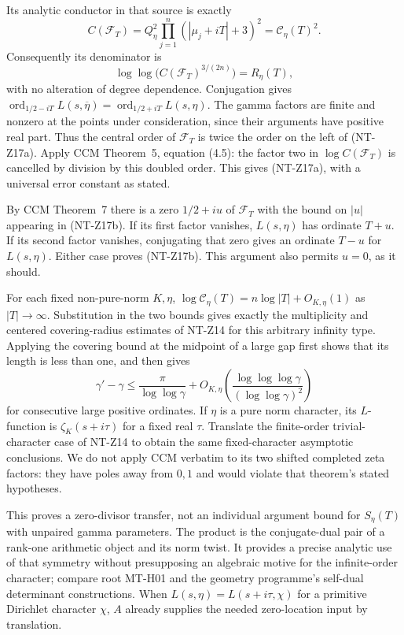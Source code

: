 Its analytic conductor in that source is exactly
\[
 C(\mathcal F_T)=Q_\eta^2
       \prod_{j=1}^n(|\mu_j+iT|+3)^2
       =\mathscr C_\eta(T)^2.
\]
Consequently its denominator is
\[
 \log\log\bigl(C(\mathcal F_T)^{3/(2n)}\bigr)
                  =R_\eta(T),
\]
with no alteration of degree dependence.
Conjugation gives
$\operatorname{ord}_{1/2-iT}L(s,\overline\eta)
=\operatorname{ord}_{1/2+iT}L(s,\eta)$.
The gamma factors are finite and nonzero at the points under
consideration, since their arguments have positive real part.
Thus the central order of $\mathcal F_T$ is twice the order on
the left of (NT-Z17a).  Apply CCM Theorem~5, equation (4.5): the
factor two in $\log C(\mathcal F_T)$ is cancelled by division
by this doubled order.  This gives (NT-Z17a), with a universal
error constant as stated.

By CCM Theorem~7 there is a zero $1/2+iu$ of $\mathcal F_T$
with the bound on $|u|$ appearing in (NT-Z17b).  If its first
factor vanishes, $L(s,\eta)$ has ordinate $T+u$.
If its second factor vanishes, conjugating that zero gives an
ordinate $T-u$ for $L(s,\eta)$.  Either case proves (NT-Z17b).
This argument also permits $u=0$, as it should.

For each fixed non-pure-norm $K,\eta$,
$\log\mathscr C_\eta(T)=n\log|T|+O_{K,\eta}(1)$ as
$|T|\to\infty$.  Substitution in the two bounds gives exactly
the multiplicity and centered covering-radius estimates of
NT-Z14 for this arbitrary infinity type.  Applying the covering
bound at the midpoint of a large gap first shows that its length
is less than one, and then gives
\[
 \gamma'-\gamma\le\frac{\pi}{\log\log\gamma}
    +O_{K,\eta}\left(
        \frac{\log\log\log\gamma}{(\log\log\gamma)^2}\right)
\]
for consecutive large positive ordinates.  If $\eta$ is a pure
norm character, its $L$-function is $\zeta_K(s+i\tau)$ for a
fixed real $\tau$.  Translate the finite-order trivial-character
case of NT-Z14 to obtain the same fixed-character asymptotic
conclusions.  We do not apply CCM verbatim to its two shifted
completed zeta factors: they have poles away from $0,1$ and would
violate that theorem's stated hypotheses.

This proves a zero-divisor transfer, not an individual argument
bound for $S_\eta(T)$ with unpaired gamma parameters.  The product
is the conjugate-dual pair of a rank-one arithmetic object and its
norm twist.  It provides a precise analytic use of that symmetry
without presupposing an algebraic motive for the infinite-order
character; compare root MT-H01 and the geometry programme's
self-dual determinant constructions.
When $L(s,\eta)=L(s+i\tau,\chi)$ for a primitive Dirichlet
character $\chi$, $A$ already supplies the needed zero-location
input by translation.

